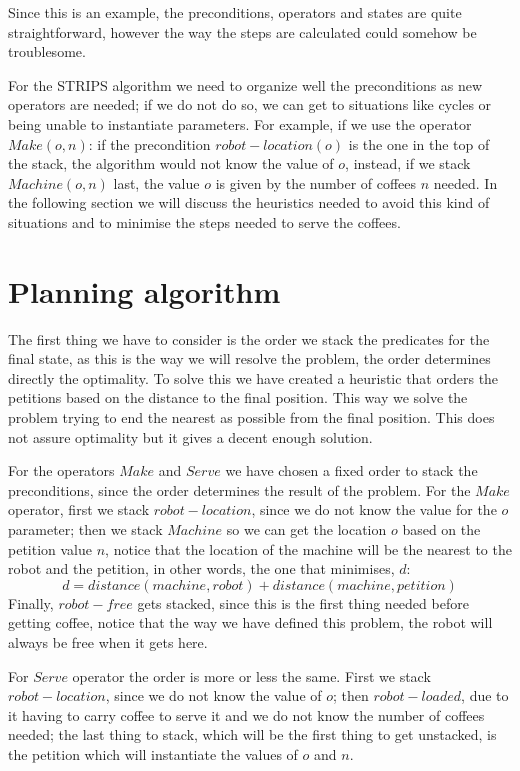 \documentclass[12pt,a4paper,oneside]{article}
\numberwithin{equation}{section}
\numberwithin{equation}{section}
\theoremstyle{definition}
\begin{document}
Since this is an example, the preconditions, operators and states are quite straightforward, however the way the steps are calculated could somehow be troublesome.

For the STRIPS algorithm we need to organize well the preconditions as new operators are needed; if we do not do so, we can get to situations like cycles or being unable to instantiate parameters. For example, if we use the operator $Make(o,n)$: if the precondition $robot-location(o)$ is the one in the top of the stack, the algorithm would not know the value of $o$, instead, if we stack $Machine(o,n)$ last, the value $o$ is given by the number of coffees $n$ needed. In the following section we will discuss the heuristics needed to avoid this kind of situations and to minimise the steps needed to serve the coffees.


\section{Planning algorithm}

The first thing we have to consider is the order we stack the predicates for the final state, as this is the way we  will resolve the problem, the order determines directly the optimality. To solve this we have created a heuristic that orders the petitions based on the distance to the final position. This way we solve the problem trying to end the nearest as possible from the final position. This does not assure optimality but it gives a decent enough solution.

For the operators $Make$ and $Serve$ we have chosen a fixed order to stack the preconditions, since the order determines the result of the problem. For the $Make$ operator, first we stack $robot-location$, since we do not know the value for the $o$ parameter; then we stack $Machine$ so we can get the location $o$ based on the petition value $n$, notice that the location of the machine will be the nearest to the robot and the petition, in other words, the one that minimises, $d$:
$$d = distance(machine, robot) + distance(machine, petition)$$
 Finally, $robot- free$ gets stacked, since this is the first thing needed before getting coffee, notice that the way we have defined this problem, the robot will always be free when it gets here.
 
 For $Serve$ operator the order is more or less the same. First we stack $robot-location$, since we do not know the value of $o$; then $robot-loaded$, due to it having to carry coffee to serve it and we do not know the number of coffees needed; the last thing to stack, which will be the first thing to get unstacked, is the petition which will instantiate the values of $o$ and $n$.
 
\end{document}
